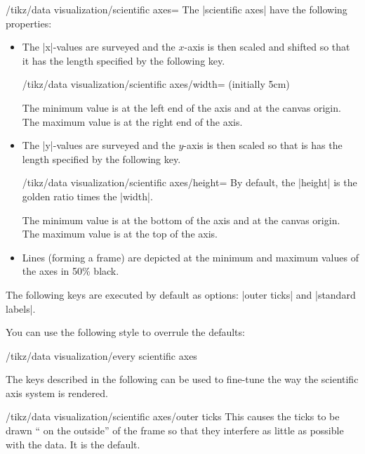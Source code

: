 \begin{key}{/tikz/data visualization/scientific axes=}
    The |scientific axes| have the following properties:
    \begin{itemize}
        \item The |x|-values are surveyed and the $x$-axis is then scaled and
            shifted so  that it has the length specified by the following key.
            \begin{key}{/tikz/data visualization/scientific axes/width= (initially 5cm)}
            \end{key}
            The minimum value is at the left end of the axis and at the canvas
            origin. The maximum value is at the right end of the axis. \item
            The |y|-values are surveyed and the $y$-axis is then scaled so that
            is has the length specified by the following key.
            \begin{key}{/tikz/data visualization/scientific axes/height=}
                By default, the |height| is the golden ratio times the |width|.
            \end{key}
            The minimum value is at the bottom of the axis and at the canvas
            origin. The maximum value is at the top of the axis.
        \item Lines (forming a frame) are depicted at the minimum and maximum
            values of the axes in 50\% black.
    \end{itemize}

    The following keys are executed by default as options: |outer ticks| and
    |standard labels|.

    You can use the following style to overrule the defaults:

    \begin{stylekey}{/tikz/data visualization/every scientific axes}
    \end{stylekey}
\end{key}

The keys described in the following can be used to fine-tune the way the
scientific axis system is rendered.

\begin{key}{/tikz/data visualization/scientific axes/outer ticks}
    This causes the ticks to be drawn `` on the outside'' of the frame so that
    they interfere as little as possible with the data. It is the default.
\begin{codeexample}[
    width=7cm,
    preamble={\usetikzlibrary{datavisualization.formats.functions}},
]
\end{codeexample}
\end{key}

